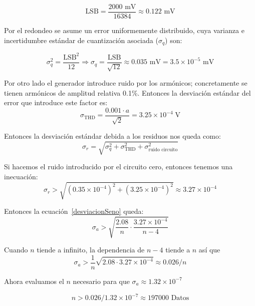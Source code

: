 \begin{equation}
\text{LSB} = \frac{2000\text{ mV}}{16384} \approx 0.122\text{ mV}
\label{eq:lsb_rp_lv}
\end{equation}

Por el redondeo se asume un error uniformemente distribuido, cuya varianza e incertidumbre estándar de cuantización asociada ($\sigma_q$) son:

\begin{equation}
\sigma_q^2 = \frac{\text{LSB}^2}{12} \Rightarrow \sigma_q = \frac{\text{LSB}}{\sqrt{12}} \approx 0.035\text{ mV} = 3.5 \times 10^{-5}\text{ mV}
\label{eq:sigma_rp_lv}
\end{equation}

Por otro lado el generador introduce ruido por los armónicos; concretamente se tienen armónicos de amplitud relativa 0.1\%. Entonces la desviación estándar del error que introduce este factor es:
\begin{equation}
    \sigma_{\mathrm{THD}} = \frac{0.001 \cdot a}{\sqrt{2}} = 3.25\times 10^{-4}\;\mathrm{V}
\end{equation}

Entonces la desviación estándar debida a los residuos nos queda como:
\begin{equation}
    \sigma_r = \sqrt{\sigma_q^2 + \sigma_{\mathrm{THD}}^2 + \sigma_{\text{ruido circuito}}^2}
\end{equation}

Si hacemos el ruido introducido por el circuito cero, entonces tenemos una inecuación:
\begin{equation}
    \sigma_r > \sqrt{(0.35\times 10^{-4})^2 + (3.25\times 10^{-4})^2} \approx 3.27\times 10^{-4}
\end{equation}

Entonces la ecuación~\ref{desviacionSeno} queda:
\begin{equation}
    \sigma_a > \sqrt{\frac{2.08}{n} \cdot \frac{3.27\times 10^{-4}}{n-4}}
\end{equation}

Cuando $n$ tiende a infinito, la dependencia de $n-4$ tiende a $n$ así que
\begin{equation}
    \sigma_a > \frac{1}{n}\sqrt{2.08 \cdot 3.27\times 10^{-4}} \approx 0.026 / n
\end{equation}

Ahora evaluamos el $n$ necesario para que $\sigma_a \approx 1.32\times 10^{-7}$

\begin{equation} \label{numero-de-datos}
    n > 0.026/1.32\times 10^{-7} \approx 197000 \text{ Datos}
\end{equation}


